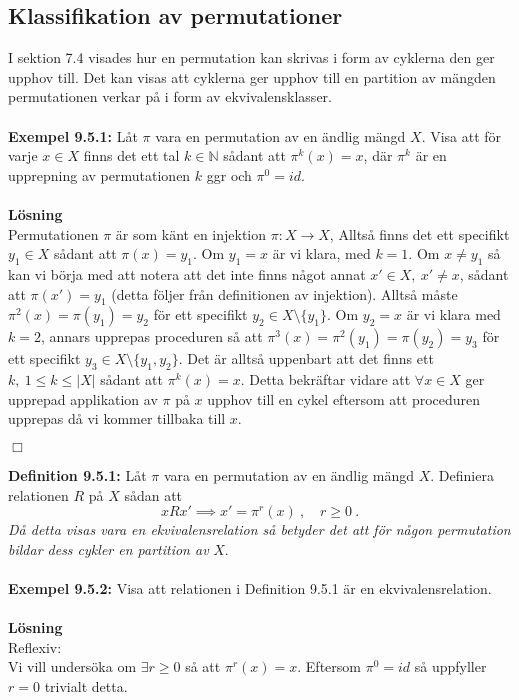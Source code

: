 \documentclass{article}
\begin{document}
\subsection{Klassifikation av permutationer}
I sektion 7.4 visades hur en permutation kan skrivas i form av cyklerna den ger upphov till. Det kan visas att cyklerna ger upphov till en partition av mängden permutationen verkar på i form av ekvivalensklasser.
\\ \\
\textbf{Exempel 9.5.1:} Låt $\pi$ vara en permutation av en ändlig mängd $X$. Visa att för varje $x\in X$ finns det ett tal $k\in\mathbb{N}$ sådant att $\pi^k(x)=x$, där $\pi^k$ är en upprepning av permutationen $k$ ggr och $\pi^0=id$.
\\ \\
\textbf{Lösning}
\\
Permutationen $\pi$ är som känt en injektion $\pi:X\rightarrow X$, Alltså finns det ett specifikt $y_1\in X$ sådant att $\pi(x)=y_1$. Om $y_1=x$ är vi klara, med $k=1$. Om $x\neq y_1$ så kan vi börja med att notera att det inte finns något annat $x'\in X, \ x'\neq x$, sådant att $\pi(x')=y_1$ (detta följer från definitionen av injektion). Alltså måste $\pi^2(x)=\pi(y_1)=y_2$ för ett specifikt $y_2\in X\setminus\{y_1\}$. Om $y_2=x$ är vi klara med $k=2$, annars upprepas proceduren så att $\pi^3(x)=\pi^2(y_1)=\pi(y_2)=y_3$ för ett specifikt $y_3\in X\setminus\{y_1,y_2\}$. Det är alltså uppenbart att det finns ett $k, \ 1\leq k \leq |X|$ sådant att $\pi^k(x)=x$. Detta bekräftar vidare att $\forall x\in X$ ger upprepad applikation av $\pi$ på $x$ upphov till en cykel eftersom att proceduren upprepas då vi kommer tillbaka till $x$. 
\begin{flushright}
$\Box$
\end{flushright}
\textbf{Definition 9.5.1:} Låt $\pi$ vara en permutation av en ändlig mängd $X$. Definiera relationen $R$ på $X$ sådan att
$$
xRx' \implies x'=\pi^r(x) \ , \quad r\geq 0 \ .
$$
\textit{Då detta visas vara en ekvivalensrelation så betyder det att för någon permutation bildar dess cykler en partition av} $X$.
\\ \\
\textbf{Exempel 9.5.2:} Visa att relationen i Definition 9.5.1 är en ekvivalensrelation.
\\ \\
\textbf{Lösning}
\\
Reflexiv:
\\
Vi vill undersöka om $\exists r\geq0$ så att $\pi^r(x)=x$. Eftersom $\pi^0=id$ så uppfyller $r=0$ trivialt detta.
\end{document}
